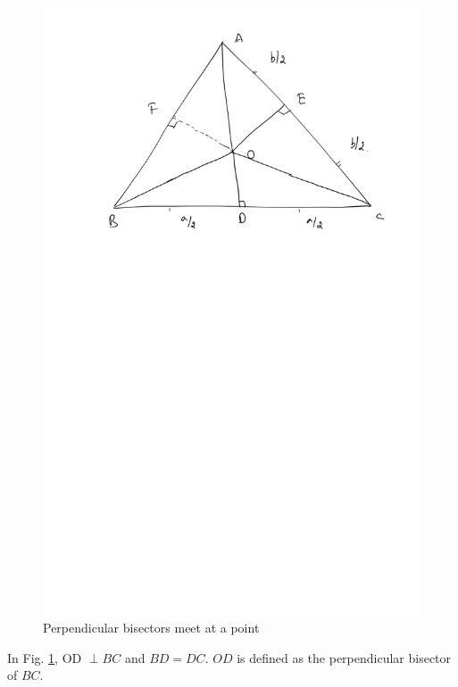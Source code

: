 \begin{figure}[!h]
	\begin{center}
		
		\includegraphics[width=\columnwidth]{./figs/ch3_perp_bisector}
		\vspace*{-10cm}
	\end{center}
	\caption{Perpendicular bisectors meet at a point}
	\label{ch3_perp_bisector}	
\end{figure}
%
\begin{definition}
	In Fig. \ref{ch3_perp_bisector}, OD $\perp BC$ and $BD=DC$. $OD$ is defined as the perpendicular bisector of $BC$.
\end{definition}
